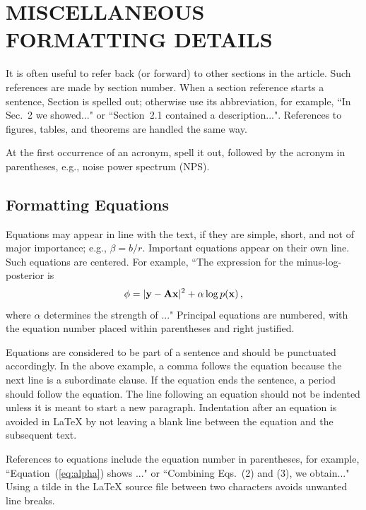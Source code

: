 \documentclass[]{spie}  %
\begin{document}
\appendix    %
\section{MISCELLANEOUS FORMATTING DETAILS} \label{sec:misc}

It is often useful to refer back (or forward) to other sections in the article.  Such references are made by section number.  When a section reference starts a sentence, Section is spelled out; otherwise use its abbreviation, for example, ``In Sec.~2 we showed..." or ``Section~2.1 contained a description...".  References to figures, tables, and theorems are handled the same way.

At the first occurrence of an acronym, spell it out, followed by the acronym in parentheses, e.g., noise power spectrum (NPS).  
 
\subsection{Formatting Equations} 
Equations may appear in line with the text, if they are simple, short, and not of major importance; e.g., $\beta = b/r$.  Important equations appear on their own line.  Such equations are centered.  For example, ``The expression for the minus-log-posterior is
	\begin{equation}
	\label{eq:alpha}
\phi = |{\rm\bf y} - {\rm\bf A}{\rm\bf x}|^2 + \alpha \log p({\rm\bf x}) \, ,
	\end{equation}
where $\alpha$ determines the strength of ..."  Principal equations are numbered, with the equation number placed within parentheses and right justified.  

Equations are considered to be part of a sentence and should be punctuated accordingly. In the above example, a comma follows the equation because the next line is a subordinate clause.  If the equation ends the sentence, a period should follow the equation.  The line following an equation should not be indented unless it is meant to start a new paragraph.  Indentation after an equation is avoided in LaTeX by not leaving a blank line between the equation and the subsequent text.

References to equations include the equation number in parentheses, for example, ``Equation~(\ref{eq:alpha}) shows ..." or ``Combining Eqs.~(2) and (3), we obtain..."  Using a tilde in the LaTeX source file between two characters avoids unwanted line breaks.
\end{document}
